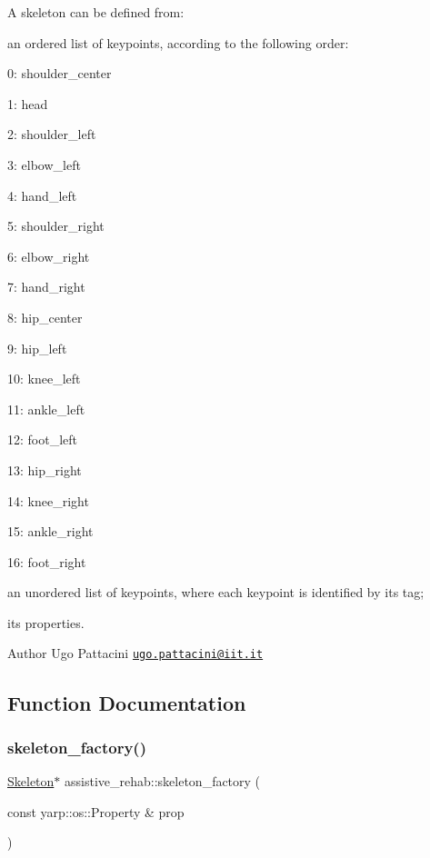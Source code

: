 A skeleton can be defined from\+:
\begin{DoxyItemize}
\item an ordered list of keypoints, according to the following order\+:
\begin{DoxyItemize}
\item 0\+: shoulder\+\_\+center
\item 1\+: head
\item 2\+: shoulder\+\_\+left
\item 3\+: elbow\+\_\+left
\item 4\+: hand\+\_\+left
\item 5\+: shoulder\+\_\+right
\item 6\+: elbow\+\_\+right
\item 7\+: hand\+\_\+right
\item 8\+: hip\+\_\+center
\item 9\+: hip\+\_\+left
\item 10\+: knee\+\_\+left
\item 11\+: ankle\+\_\+left
\item 12\+: foot\+\_\+left
\item 13\+: hip\+\_\+right
\item 14\+: knee\+\_\+right
\item 15\+: ankle\+\_\+right
\item 16\+: foot\+\_\+right
\end{DoxyItemize}
\item an unordered list of keypoints, where each keypoint is identified by its tag;
\item its properties.
\end{DoxyItemize}

\begin{DoxyAuthor}{Author}
Ugo Pattacini \href{mailto:ugo.pattacini@iit.it}{\tt ugo.\+pattacini@iit.\+it} 
\end{DoxyAuthor}


\subsection{Function Documentation}
\mbox{\label{group__skeleton_gafe9fe27bb8b50a0843b93dfbb5c571b1}} 
\subsubsection{\texorpdfstring{skeleton\+\_\+factory()}{skeleton\_factory()}}
{\footnotesize\ttfamily \hyperlink{classassistive__rehab_1_1Skeleton}{Skeleton}$\ast$ assistive\+\_\+rehab\+::skeleton\+\_\+factory (\begin{DoxyParamCaption}\item[{const yarp\+::os\+::\+Property \&}]{prop }\end{DoxyParamCaption})}



